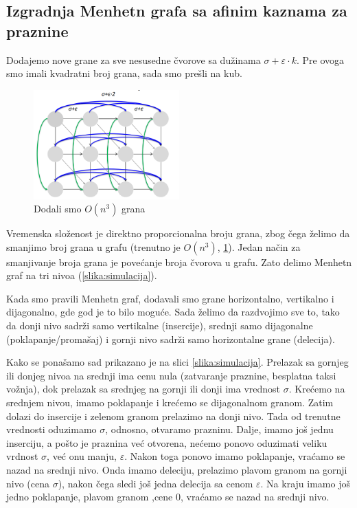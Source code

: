 \subsection{Izgradnja Menhetn grafa sa afinim kaznama za praznine}

Dodajemo nove grane za sve nesusedne čvorove sa dužinama $\sigma + \varepsilon \cdot k$. Pre ovoga smo imali kvadratni broj grana, sada smo prešli na kub.

\begin{figure}[h!]
\centering
\includegraphics[width=0.5\textwidth]{poglavlja/5/slike/MenhettnAifnePraznine.png}
\caption{Dodali smo $O(n^3)$ grana}
\label{slika:afiniMenhetn}
\end{figure}

Vremenska složenost je direktno proporcionalna broju grana, zbog čega želimo da smanjimo broj grana u grafu (trenutno je $O(n^3)$, \ref{slika:afiniMenhetn}). Jedan način za smanjivanje broja grana je povećanje broja čvorova u grafu. Zato delimo Menhetn graf na tri nivoa (\ref{slika:simulacija}).

Kada smo pravili Menhetn graf, dodavali smo grane horizontalno, vertikalno i dijagonalno, gde god je to bilo moguće. Sada želimo da razdvojimo sve to, tako da donji nivo sadrži samo vertikalne (insercije), srednji samo dijagonalne (poklapanje/promašaj) i gornji nivo sadrži samo horizontalne grane (delecija).

Kako se ponašamo sad prikazano je na slici \ref{slika:simulacija}. Prelazak sa gornjeg ili donjeg nivoa na srednji ima cenu nula (zatvaranje praznine, besplatna taksi vožnja), dok prelazak sa srednjeg na gornji ili donji ima vrednost $\sigma$. Krećemo na srednjem nivou, imamo poklapanje i krećemo se dijagonalnom granom. Zatim dolazi do insercije i zelenom granom prelazimo na donji nivo. Tada od trenutne vrednosti oduzimamo $\sigma$, odnosno, otvaramo prazninu. Dalje, imamo još jednu inserciju, a pošto je praznina već otvorena, nećemo ponovo oduzimati veliku vrdnost $\sigma$, već onu manju, $\varepsilon$. Nakon toga ponovo imamo poklapanje, vraćamo se nazad na srednji nivo. Onda imamo deleciju, prelazimo plavom granom na gornji nivo (cena $\sigma$), nakon čega sledi još jedna delecija sa cenom $\varepsilon$. Na kraju imamo još jedno poklapanje, plavom granom ,cene 0, vraćamo se nazad na srednji nivo.

